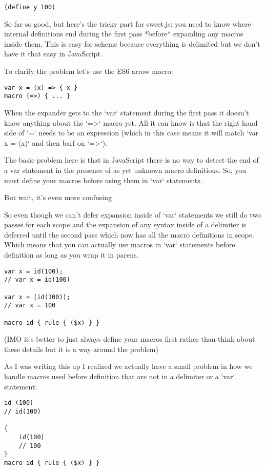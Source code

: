 \documentclass[onecolumn]{sigplanconf-onecolumn}
\begin{document}
\begin{lstlisting}
(define y 100)
\end{lstlisting}

So far so good, but here's the tricky part for sweet.js: you need to
know where internal definitions end during the first pass
*before* expanding any macros inside them. This is easy for scheme
because everything is delimited but we don't have it that easy in
JavaScript.

To clarify the problem let's use the ES6 arrow macro:

\begin{lstlisting}
var x = (x) => { x }
macro (=>) { ... }
\end{lstlisting}

When the expander gets to the `var` statement during the first pass
it doesn't know anything about the `=>` macro yet. All it can
know is that the right hand side of `=` needs to be an expression
(which in this case means it will match `var x = (x)` and then barf
on `=>`).

The basic problem here is that in JavaScript there is no way
to detect the end of a var statement in the presence of as yet
unknown macro definitions. So, you must define your macros
before using them in `var` statements.

But wait, it's even more confusing

So even though we can't defer expansion inside of `var` statements
we still do two passes for each scope and the expansion of any
syntax inside of a delimiter is deferred until the second pass
which now has all the macro definitions in scope. Which means that
you can actually use macros in `var` statements before definition
as long as you wrap it in parens.

\begin{lstlisting}
var x = id(100);
// var x = id(100)

var x = (id(100));
// var x = 100

macro id { rule { ($x) } }
\end{lstlisting}

(IMO it's better to just always define your macros first rather
than think about these details but it is a way around the problem)

As I was writing this up I realized we actually have a small problem
in how we handle macros used before definition that are not in a
delimiter or a `var` statement:

\begin{lstlisting}
id (100)
// id(100)

{
	id(100)
    // 100
}
macro id { rule { ($x) } }
\end{lstlisting}
\end{document}
